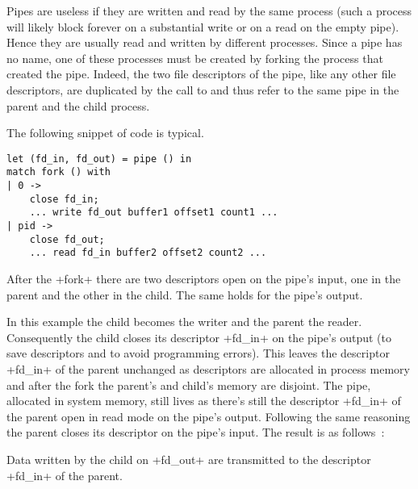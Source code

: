 Pipes are useless if they are written and read by the same process
(such a process will likely block forever on a substantial write or on
a read on the empty pipe). Hence they are usually read and written by
different processes. Since a pipe has no name, one of these processes
must be created by forking the process that created the pipe. Indeed,
the two file descriptors of the pipe, like any other file descriptors,
are duplicated by the call to  and thus refer to the
same pipe in the parent and the child process.
\begin{example} The following snippet of code is typical.
%
\begin{lstlisting}
let (fd_in, fd_out) = pipe () in
match fork () with
| 0 ->
    close fd_in;
    ... write fd_out buffer1 offset1 count1 ...
| pid ->
    close fd_out;
    ... read fd_in buffer2 offset2 count2 ...
\end{lstlisting}
% 
After the \ml+fork+ there are two descriptors open on the pipe's
input, one in the parent and the other in the child. The same
holds for the pipe's output.
%
\begin{myimage}[width="45\%"]
\end{myimage}
% 
In this example the child becomes the writer and the parent the
reader. Consequently the child closes its descriptor \ml+fd_in+ on the
pipe's output (to save descriptors and to avoid programming
errors). This leaves the descriptor \ml+fd_in+ of the parent unchanged
as descriptors are allocated in process memory and after the fork the
parent's and child's memory are disjoint. The pipe, allocated in system
memory, still lives as there's still the descriptor \ml+fd_in+ of the
parent open in read mode on the pipe's output. Following the same
reasoning the parent closes its descriptor on the pipe's input. The
result is as follows~:
%
\begin{myimage}[width="45\%"]
\end{myimage}
% 
Data written by the child on \ml+fd_out+ are transmitted to the
descriptor \ml+fd_in+ of the parent.
\end{example}

